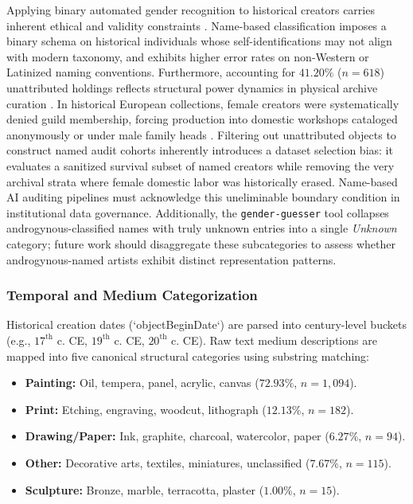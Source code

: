 \documentclass[pdflatex,sn-mathphys-num]{sn-jnl}%
\theoremstyle{thmstyleone}%
\theoremstyle{thmstyletwo}%
\theoremstyle{thmstylethree}%
\begin{document}
Applying binary automated gender recognition to historical creators carries inherent ethical and validity constraints \cite{keyes2018misgendering}. Name-based classification imposes a binary schema on historical individuals whose self-identifications may not align with modern taxonomy, and exhibits higher error rates on non-Western or Latinized naming conventions. Furthermore, accounting for $41.20\%$ ($n=618$) unattributed holdings reflects structural power dynamics in physical archive curation \cite{bowker2000sorting, carlson2022museum, bailey2020gender, topaz2019diversity}. In historical European collections, female creators were systematically denied guild membership, forcing production into domestic workshops cataloged anonymously or under male family heads \cite{bailey2020gender}. Filtering out unattributed objects to construct named audit cohorts inherently introduces a dataset selection bias: it evaluates a sanitized survival subset of named creators while removing the very archival strata where female domestic labor was historically erased. Name-based AI auditing pipelines must acknowledge this uneliminable boundary condition in institutional data governance. Additionally, the \texttt{gender-guesser} tool collapses androgynous-classified names with truly unknown entries into a single \textit{Unknown} category; future work should disaggregate these subcategories to assess whether androgynous-named artists exhibit distinct representation patterns.

\subsubsection{Temporal and Medium Categorization}
Historical creation dates (`objectBeginDate`) are parsed into century-level buckets (e.g., $17^{\text{th}}$ c. CE, $19^{\text{th}}$ c. CE, $20^{\text{th}}$ c. CE). Raw text medium descriptions are mapped into five canonical structural categories using substring matching:
\begin{itemize}
    \item \textbf{Painting:} Oil, tempera, panel, acrylic, canvas ($72.93\%$, $n=1{,}094$).
    \item \textbf{Print:} Etching, engraving, woodcut, lithograph ($12.13\%$, $n=182$).
    \item \textbf{Drawing/Paper:} Ink, graphite, charcoal, watercolor, paper ($6.27\%$, $n=94$).
    \item \textbf{Other:} Decorative arts, textiles, miniatures, unclassified ($7.67\%$, $n=115$).
    \item \textbf{Sculpture:} Bronze, marble, terracotta, plaster ($1.00\%$, $n=15$).
\end{itemize}
\end{document}
